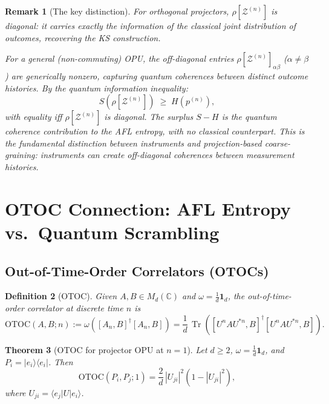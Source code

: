 \documentclass[12pt,a4paper]{article}
\newtheorem{theorem}{Theorem}[section]
\newtheorem{definition}[theorem]{Definition}
\newtheorem{remark}[theorem]{Remark}
\DeclareMathOperator{\Tr}{Tr}
\begin{document}
\begin{remark}[The key distinction]
\label{rem:difference}
For orthogonal projectors, $\rho[\mathcal{Z}^{(n)}]$ is diagonal: it carries exactly
the information of the \emph{classical} joint distribution of outcomes, recovering the KS
construction.

For a general (non-commuting) OPU, the off-diagonal entries
$\rho[\mathcal{Z}^{(n)}]_{\alpha\beta}$ ($\alpha\neq\beta$) are generically
nonzero, capturing \emph{quantum coherences between distinct outcome histories}.  By
the quantum information inequality:
\begin{equation}\label{eq:S_geq_H}
  S\!\left(\rho[\mathcal{Z}^{(n)}]\right) \;\geq\; H\!\left(p^{(n)}\right),
\end{equation}
with equality iff $\rho[\mathcal{Z}^{(n)}]$ is diagonal.  The surplus
$S - H$ is the \emph{quantum coherence contribution} to the AFL entropy, with no
classical counterpart.  This is the fundamental distinction between instruments and
projection-based coarse-graining: instruments can create off-diagonal coherences
between measurement histories.
\end{remark}

\section{OTOC Connection: AFL Entropy vs.\ Quantum Scrambling}
\label{sec:otoc}

\subsection{Out-of-Time-Order Correlators (OTOCs)}

\begin{definition}[OTOC]
\label{def:otoc}
Given $A,B\in M_d(\mathbb{C})$ and $\omega=\frac{1}{d}\mathbf{1}_d$, the
\emph{out-of-time-order correlator} at discrete time $n$ is
\[
  \mathrm{OTOC}(A,B;n)
  := \omega\!\left([A_n,B]^\dagger[A_n,B]\right)
  = \frac{1}{d}\,\Tr\!\left([U^nAU^{*n},B]^\dagger[U^nAU^{*n},B]\right).
\]
\end{definition}

\begin{theorem}[OTOC for projector OPU at $n=1$]
\label{thm:otoc_proj}
Let $d\geq 2$, $\omega=\frac{1}{d}\mathbf{1}_d$, and $P_i=|e_i\rangle\langle e_i|$.  Then
\begin{equation}\label{eq:otoc_1step}
  \mathrm{OTOC}(P_i,P_j;1)
  = \frac{2}{d}\,|U_{ji}|^2\!\left(1-|U_{ji}|^2\right),
\end{equation}
where $U_{ji}=\langle e_j|U|e_i\rangle$.
\end{theorem}
\end{document}
